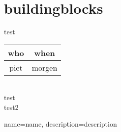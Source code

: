 \chapter{buildingblocks}
test	\\


\begin{tabular}{|c|c|}
	\hline
	who & when \\
	\hline
	piet & morgen \\
	\hline
\end{tabular}
\\
test \parencite{Bliek2017}
\\
test2 \parencite{Doe2100}
\\
\lipsum[1]


{
	name=name,
	description={description}
}
